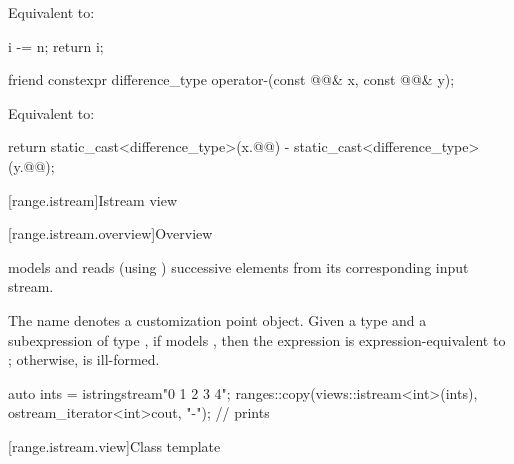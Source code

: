 \begin{itemdescr}
\pnum
\effects
Equivalent to:
\begin{codeblock}
i -= n;
return i;
\end{codeblock}
\end{itemdescr}

%
\begin{itemdecl}
friend constexpr difference_type operator-(const @@& x, const @@& y);
\end{itemdecl}

\begin{itemdescr}
\pnum
\effects
Equivalent to:
\begin{codeblock}
return static_cast<difference_type>(x.@@) - static_cast<difference_type>(y.@@);
\end{codeblock}
\end{itemdescr}

[range.istream]{Istream view}

[range.istream.overview]{Overview}

\pnum
{} models  and
reads (using ) successive elements
from its corresponding input stream.

\pnum
The name  denotes
a customization point object.
Given a type  and a subexpression  of type ,
if  models
,
then the expression  is expression-equivalent to
;
otherwise,  is ill-formed.

\pnum
\begin{example}
\begin{codeblock}
auto ints = istringstream{"0 1  2   3     4"};
ranges::copy(views::istream<int>(ints), ostream_iterator<int>{cout, "-"});
// prints 
\end{codeblock}
\end{example}

[range.istream.view]{Class template }

